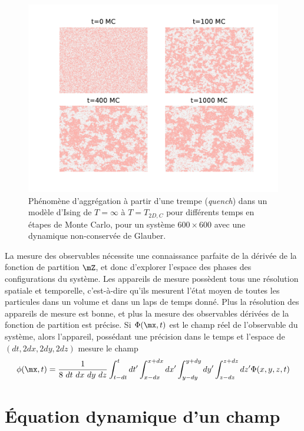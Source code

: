 \begin{figure}[t]
    \centering
    \includegraphics[width=0.9\linewidth]{intro/clusterization.pdf}
    \caption{Phénomène d'aggrégation à partir d'une trempe (\textit{quench}) dans un modèle d'Ising de $T=\infty$ à $T=T_{2D,C}$ \cite{onsager_crystal_1944} pour différents temps en étapes de Monte Carlo, pour un système $600 \times 600$ avec une dynamique non-conservée de Glauber.}
    \label{clusterization}
\end{figure}

La mesure des observables nécessite une connaissance parfaite de la dérivée de la fonction de partition $\mZ$, et donc d'explorer l'espace des phases des configurations du système. Les appareils de mesure possèdent tous une résolution spatiale et temporelle, c'est-à-dire qu'ils mesurent l'état moyen de toutes les particules dans un volume et dans un laps de temps donné. Plus la résolution des appareils de mesure est bonne, et plus la mesure des observables dérivées de la fonction de partition est précise. Si $\Phi(\mx,t)$ est le champ réel de l'observable du système, alors l'appareil, possédant une précision dans le temps et l'espace de $(dt,2dx,2dy,2dz)$ mesure le champ
\begin{align}
    \phi(\mx,t) = \frac{1}{8~ dt~ dx~ dy~ dz} \int_{t-dt}^{t} dt' \int_{x-dx}^{x+dx} dx' \int_{y-dy}^{y+dy} dy' \int_{z-dz}^{z+dz} dz' \Phi(x,y,z,t)
    \label{renormalisation}
\end{align}


\section{Équation dynamique d'un champ}

